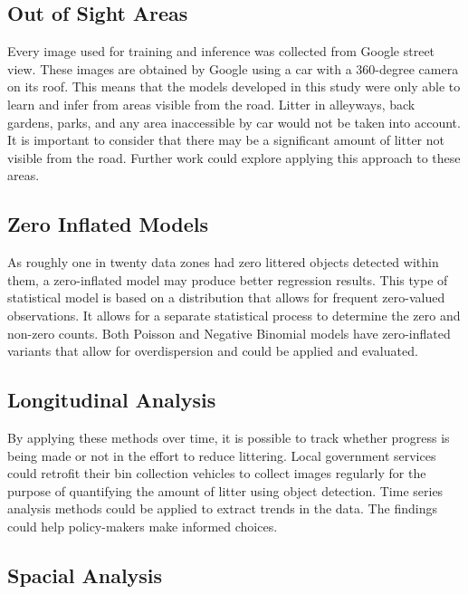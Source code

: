 \documentclass{thesis}
\begin{document}
\subsection{Out of Sight Areas}

Every image used for training and inference was collected from Google street view. These images are obtained by Google using a car with a 360-degree camera on its roof. This means that the models developed in this study were only able to learn and infer from areas visible from the road. Litter in alleyways, back gardens, parks, and any area inaccessible by car would not be taken into account. It is important to consider that there may be a significant amount of litter not visible from the road. Further work could explore applying this approach to these areas.

\subsection{Zero Inflated Models}

As roughly one in twenty data zones had zero littered objects detected within them, a zero-inflated model may produce better regression results. This type of statistical model is based on a distribution that allows for frequent zero-valued observations. It allows for a separate statistical process to determine the zero and non-zero counts. Both Poisson and Negative Binomial models have zero-inflated variants that allow for overdispersion and could be applied and evaluated.

\subsection{Longitudinal Analysis}

By applying these methods over time, it is possible to track whether progress is being made or not in the effort to reduce littering. Local government services could retrofit their bin collection vehicles to collect images regularly for the purpose of quantifying the amount of litter using object detection. Time series analysis methods could be applied to extract trends in the data. The findings could help policy-makers make informed choices.

\subsection{Spacial Analysis}
\end{document}
